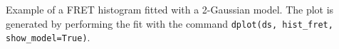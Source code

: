 \label{fig:histfit} Example of a FRET histogram fitted with a 2-Gaussian model. The plot is generated by performing the fit with the command \texttt{dplot(ds, hist\_fret, show\_model=True)}.